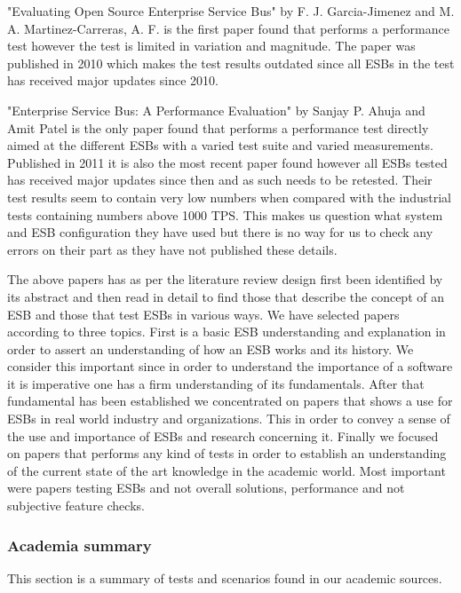 "Evaluating Open Source Enterprise Service Bus" \cite{Garcia2010} by F. J. Garcia-Jimenez and M. A. Martinez-Carreras, A. F. is the first paper found that performs a performance test however the test is limited in variation and magnitude. The paper was published in 2010 which makes the test results outdated since all ESBs in the test has received major updates since 2010.


"Enterprise Service Bus: A Performance Evaluation" \cite{Sanjay2011} by Sanjay P. Ahuja and Amit Patel  is the only paper found that performs a performance test directly aimed at the different ESBs with a varied test suite and varied measurements. 
Published in 2011 it is also the most recent paper found however all ESBs tested has received major updates since then and as such needs to be retested. 
Their test results seem to contain very low numbers when compared with the industrial tests containing numbers above 1000 TPS. 
This makes us question what system and ESB configuration they have used but there is no way for us to check any errors on their part as they have not published these details.


The above papers has as per the literature review design first been identified by its abstract and then read in detail to find those that describe the concept of an ESB and those that test ESBs in various ways. 
We have selected papers according to three topics. 
First is a basic ESB understanding and explanation in order to assert an understanding of how an ESB works and its history. 
We consider this important since in order to understand the importance of a software it is imperative one has a firm understanding of its fundamentals. 
After that fundamental has been established we concentrated on papers that shows a use for ESBs in real world industry and organizations. 
This in order to convey a sense of the use and importance of ESBs and research concerning it.
Finally we focused on papers that performs any kind of tests in order to establish an understanding of the current state of the art knowledge in the academic world. 
Most important were papers testing ESBs and not overall solutions, performance and not subjective feature checks.

\newpage
\subsubsection{Academia summary}
This section is a summary of tests and scenarios found in our academic sources.

